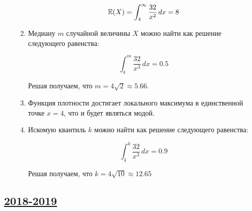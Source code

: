 \begin{enumerate}
\begin{enumerate}
	\[
	\operatorname{\mathbb{E}}(X)=\int_{4}^{\infty} \frac{32}{x^2} \, dx=8
	\]
	
	\item Медиану $m$ случайной величины $X$ можно найти как решение следующего равенства:
	
	\[
	\int_{4}^{m} \frac{32}{x^3} \, dx=0.5
	\]
	
	Решая получаем, что $m=4\sqrt{2}\approx 5.66$.
	
	\item Функция плотности достигает локального максимума в единственной точке $x=4$, что и будет являться модой.
	
	\item Искомую квантиль $k$ можно найти как решение следующего равенства:
	
	\[
	\int_{4}^{k} \frac{32}{x^3} \, dx=0.9
	\]
	
	Решая получаем, что $k=4\sqrt{10}\approx 12.65$
	
	\end{enumerate}
	\end{enumerate}
	
	

\subsection[2018-2019]{\hyperref[sec:kr_01_2018_2019]{2018-2019}}
\label{sec:sol_kr_01_2018_2019}

